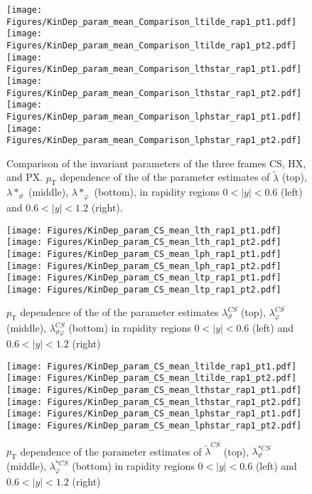 \documentclass[12pt]{article}
\newcommand{\pT}{p_\mathrm{T}}
\newcommand{\absy}{\left |  y \right |}
\newcommand{\lamtilde}{\tilde{\lambda}}
\newcommand{\lamthstar}{\lambda*_\vartheta}
\newcommand{\lamphstar}{\lambda*_\varphi}
\newcommand{\lamthCS}{\lambda^{\scriptscriptstyle CS}_\vartheta}
\newcommand{\lamphCS}{\lambda^{\scriptscriptstyle CS}_\varphi}
\newcommand{\lamthphCS}{\lambda^{\scriptscriptstyle CS}_{\vartheta \varphi}}
\newcommand{\lamtildeCS}{\tilde{\lambda}^{\scriptscriptstyle CS}}
\newcommand{\lamthstarCS}{\lambda^{* \scriptscriptstyle CS}_\vartheta}
\newcommand{\lamphstarCS}{\lambda^{* \scriptscriptstyle CS}_\varphi}
\begin{document}




\begin{figure}[htbp]
\centering
\texttt{[image: Figures/KinDep\_param\_mean\_Comparison\_ltilde\_rap1\_pt1.pdf]}
\texttt{[image: Figures/KinDep\_param\_mean\_Comparison\_ltilde\_rap1\_pt2.pdf]}
\texttt{[image: Figures/KinDep\_param\_mean\_Comparison\_lthstar\_rap1\_pt1.pdf]}
\texttt{[image: Figures/KinDep\_param\_mean\_Comparison\_lthstar\_rap1\_pt2.pdf]}
\texttt{[image: Figures/KinDep\_param\_mean\_Comparison\_lphstar\_rap1\_pt1.pdf]}
\texttt{[image: Figures/KinDep\_param\_mean\_Comparison\_lphstar\_rap1\_pt2.pdf]}
\caption{Comparison of the invariant parameters of the three frames CS, HX,
and PX. $\pT$ dependence of the of the
parameter estimates of $\lamtilde$ (top), $\lamthstar$ (middle), $\lamphstar$ (bottom), in rapidity regions $0<\absy<0.6$ (left) and
$0.6<\absy<1.2$ (right).}
\end{figure}
\clearpage





\begin{figure}[htbp]
\centering
\texttt{[image: Figures/KinDep\_param\_CS\_mean\_lth\_rap1\_pt1.pdf]}
\texttt{[image: Figures/KinDep\_param\_CS\_mean\_lth\_rap1\_pt2.pdf]}
\texttt{[image: Figures/KinDep\_param\_CS\_mean\_lph\_rap1\_pt1.pdf]}
\texttt{[image: Figures/KinDep\_param\_CS\_mean\_lph\_rap1\_pt2.pdf]}
\texttt{[image: Figures/KinDep\_param\_CS\_mean\_ltp\_rap1\_pt1.pdf]}
\texttt{[image: Figures/KinDep\_param\_CS\_mean\_ltp\_rap1\_pt2.pdf]}
\caption{$\pT$ dependence of the of the parameter estimates $\lamthCS$ (top), $\lamphCS$ (middle), $\lamthphCS$ (bottom) in rapidity regions $0<\absy<0.6$ (left) and $0.6<\absy<1.2$ (right)}
\end{figure}
\clearpage

\begin{figure}[htbp]
\centering
\texttt{[image: Figures/KinDep\_param\_CS\_mean\_ltilde\_rap1\_pt1.pdf]}
\texttt{[image: Figures/KinDep\_param\_CS\_mean\_ltilde\_rap1\_pt2.pdf]}
\texttt{[image: Figures/KinDep\_param\_CS\_mean\_lthstar\_rap1\_pt1.pdf]}
\texttt{[image: Figures/KinDep\_param\_CS\_mean\_lthstar\_rap1\_pt2.pdf]}
\texttt{[image: Figures/KinDep\_param\_CS\_mean\_lphstar\_rap1\_pt1.pdf]}
\texttt{[image: Figures/KinDep\_param\_CS\_mean\_lphstar\_rap1\_pt2.pdf]}
\caption{$\pT$ dependence of the parameter estimates of $\lamtildeCS$ (top),
$\lamthstarCS$ (middle), $\lamphstarCS$ (bottom) in rapidity regions $0<\absy<0.6$ (left) and $0.6<\absy<1.2$ (right)}
\end{figure}
\clearpage
\end{document}
